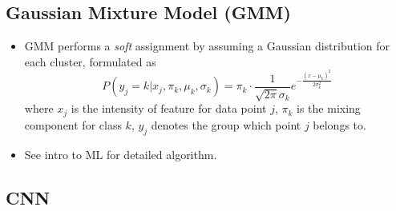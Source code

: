\documentclass[twocolumn,landscape,10pt]{article}
\theoremstyle{definition}
\begin{document}
\subsection{Gaussian Mixture Model (GMM)}

\begin{itemize}
    \item GMM performs a \emph{soft} assignment by assuming a Gaussian
        distribution for each cluster, formulated as
        \[
            P(y_j=k|x_j,\pi_k,\mu_k,\sigma_k)=
            \pi_k\cdot \frac{1}{\sqrt{2\pi}\sigma_k}
            e^{-\frac{{(x-\mu_k)}^{2}}{2\sigma^2_k}}
        \]
        where $x_j$ is the intensity of feature for data point $j$,
        $\pi_k$ is the mixing component for class $k$, $y_j$ denotes the group
        which point $j$ belongs to.
    \item See intro to ML for detailed algorithm.
\end{itemize} 

\subsection{CNN}
\end{document}
